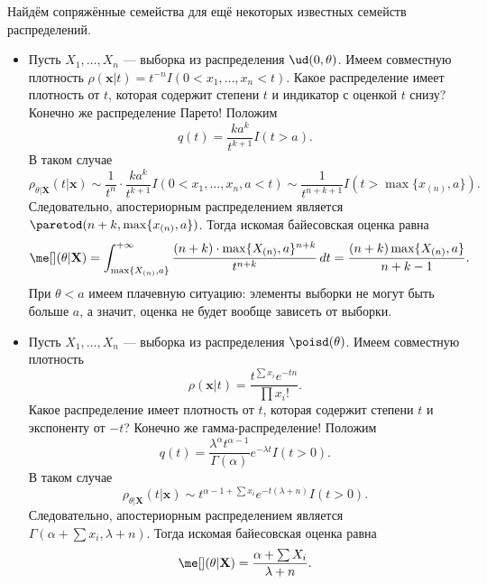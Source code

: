 \begin{example}\label{conjugate}
    Найдём сопряжённые семейства для ещё некоторых известных семейств распределений.
    \begin{itemize}
        \item Пусть $X_1, \ldots, X_n$ --- выборка из распределения $\ud(0, \theta)$. Имеем совместную плотность $\rho(\mathbf{x} | t) = t^{-n} I(0 < x_1, \ldots, x_n < t)$. Какое распределение имеет плотность от $t$, которая содержит степени $t$ и индикатор с оценкой $t$ снизу? Конечно же распределение Парето! Положим
\[
q(t) = \frac{ka^k}{t^{k+1}}I(t > a).
\]
В таком случае
\[
\rho_{\theta|\mathbf X}(t|\mathbf{x}) \sim \frac{1}{t^n}\cdot \frac{ka^k}{t^{k+1}} I(0 < x_1, \ldots, x_n, a < t) \sim \frac{1}{t^{n+k+1}} I(t > \max\{x_{(n)}, a\}).
\]
Следовательно, апостериорным распределением является $\paretod(n+k, \max\{x_{(n)}, a\})$. Тогда искомая байесовская оценка равна
\[
\me[](\theta|\mathbf X) = \int_{\max\{X_{(n)}, a\}}^{+\infty} \frac{(n+k)\cdot\max\{X_{(n)}, a\}^{n+k}}{t^{n+k}}\,dt = \frac{(n+k)\max\{X_{(n)}, a\}}{n+k-1}.
\]
При $\theta < a$ имеем плачевную ситуацию: элементы выборки не могут быть больше $a$, а значит, оценка не будет вообще зависеть от выборки.

\item Пусть $X_1, \ldots, X_n$ --- выборка из распределения $\poisd(\theta)$. Имеем совместную плотность
$$\rho(\mathbf{x} | t) = \frac{t^{\sum x_i}e^{-tn}}{\prod x_i!}.
$$
Какое распределение имеет плотность от $t$, которая содержит степени $t$ и экспоненту от $-t$? Конечно же гамма-распределение! Положим
\[
q(t) = \frac{\lambda^{\alpha} t^{\alpha - 1}}{\Gamma(\alpha)} e^{-\lambda t} I(t>0).
\]
В таком случае
\[
\rho_{\theta|\mathbf X}(t|\mathbf{x}) \sim t^{\alpha - 1 + \sum x_i} e^{-t(\lambda+n)}I(t > 0).
\]
Следовательно, апостериорным распределением является $\Gamma\left(\alpha + \sum x_i, \lambda + n\right)$. Тогда искомая байесовская оценка равна
\[
\me[](\theta|\mathbf X) = \frac{\alpha + \sum X_i}{\lambda + n}.
\]


\end{itemize}
\end{example}
